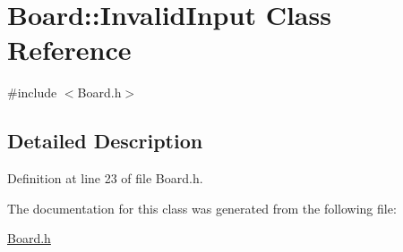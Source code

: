 \hypertarget{class_board_1_1_invalid_input}{\section{Board\+:\+:Invalid\+Input Class Reference}
\label{class_board_1_1_invalid_input}
}


{\ttfamily \#include $<$Board.\+h$>$}



\subsection{Detailed Description}


Definition at line 23 of file Board.\+h.



The documentation for this class was generated from the following file\+:\begin{DoxyCompactItemize}
\item 
\hyperlink{_board_8h}{Board.\+h}\end{DoxyCompactItemize}
